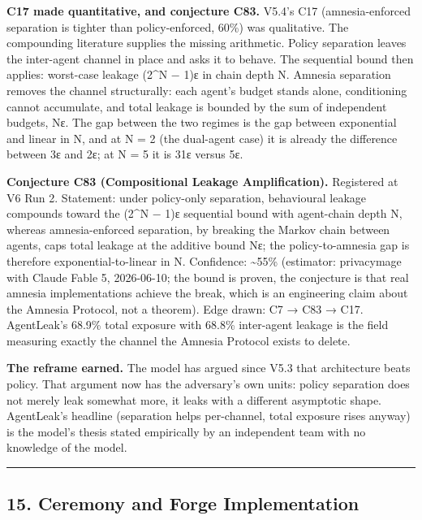 \documentclass[
  11pt,
]{article}
\begin{document}
\textbf{C17 made quantitative, and conjecture C83.} V5.4's C17
(amnesia-enforced separation is tighter than policy-enforced, 60\%) was
qualitative. The compounding literature supplies the missing arithmetic.
Policy separation leaves the inter-agent channel in place and asks it to
behave. The sequential bound then applies: worst-case leakage (2\^{}N −
1)ε in chain depth N. Amnesia separation removes the channel
structurally: each agent's budget stands alone, conditioning cannot
accumulate, and total leakage is bounded by the sum of independent
budgets, Nε. The gap between the two regimes is the gap between
exponential and linear in N, and at N = 2 (the dual-agent case) it is
already the difference between 3ε and 2ε; at N = 5 it is 31ε versus 5ε.

\textbf{Conjecture C83 (Compositional Leakage Amplification).}
Registered at V6 Run 2. Statement: under policy-only separation,
behavioural leakage compounds toward the (2\^{}N − 1)ε sequential bound
with agent-chain depth N, whereas amnesia-enforced separation, by
breaking the Markov chain between agents, caps total leakage at the
additive bound Nε; the policy-to-amnesia gap is therefore
exponential-to-linear in N. Confidence: \textasciitilde55\% (estimator:
privacymage with Claude Fable 5, 2026-06-10; the bound is proven, the
conjecture is that real amnesia implementations achieve the break, which
is an engineering claim about the Amnesia Protocol, not a theorem). Edge
drawn: C7 → C83 → C17. AgentLeak's 68.9\% total exposure with 68.8\%
inter-agent leakage is the field measuring exactly the channel the
Amnesia Protocol exists to delete.

\textbf{The reframe earned.} The model has argued since V5.3 that
architecture beats policy. That argument now has the adversary's own
units: policy separation does not merely leak somewhat more, it leaks
with a different asymptotic shape. AgentLeak's headline (separation
helps per-channel, total exposure rises anyway) is the model's thesis
stated empirically by an independent team with no knowledge of the
model.

\begin{center}\rule{0.5\linewidth}{0.5pt}\end{center}

\subsection{15. Ceremony and Forge
Implementation}\label{ceremony-and-forge-implementation}
\end{document}
